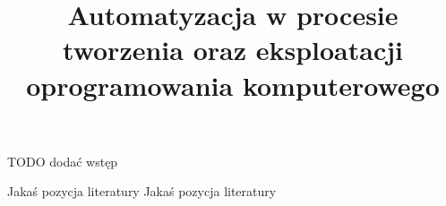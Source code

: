 \documentclass[twoside]{projektInzynierskiMS1}
\title{Automatyzacja w procesie tworzenia oraz eksploatacji oprogramowania komputerowego}
\begin{document}
TODO dodać wstęp









\begin{thebibliography}{12}

 Jakaś pozycja literatury
 Jakaś pozycja literatury

\end{thebibliography}
\end{document}
